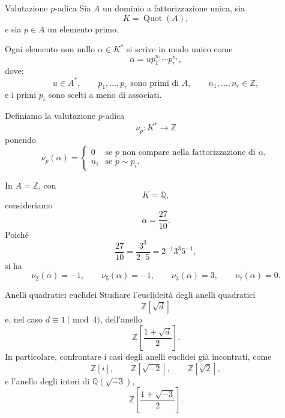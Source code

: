\documentclass[a4paper]{article}
\begin{document}
\begin{radioactive}
\begin{snippetdefinition}{Valutazione \(p\)-adica}
    Sia \(A\) un dominio a fattorizzazione unica, sia
    \[
        K=\operatorname{Quot}(A),
    \]
    e sia \(p\in A\) un elemento primo.

    Ogni elemento non nullo \(\alpha\in K^\ast\) si scrive in modo unico come
    \[
        \alpha
        =
        u p_1^{n_1}\cdots p_r^{n_r},
    \]
    dove:
    \[
        u\in A^\ast,
        \qquad
        p_1,\ldots,p_r \text{ sono primi di } A,
        \qquad
        n_1,\ldots,n_r\in\mathbb{Z},
    \]
    e i primi \(p_i\) sono scelti a meno di associati.

    Definiamo la valutazione \(p\)-adica
    \[
        \nu_p\colon K^\ast\to\mathbb{Z}
    \]
    ponendo
    \[
        \nu_p(\alpha)
        =
        \begin{cases}
            0 & \text{se } p \text{ non compare nella fattorizzazione di } \alpha,\\
            n_i & \text{se } p\sim p_i.
        \end{cases}
    \]
\end{snippetdefinition}
\end{radioactive}

\begin{radioactive}
\begin{snippetexample}{}
    In \(A=\mathbb{Z}\), con
    \[
        K=\mathbb{Q},
    \]
    consideriamo
    \[
        \alpha=\frac{27}{10}.
    \]
    Poiché
    \[
        \frac{27}{10}
        =
        \frac{3^3}{2\cdot 5}
        =
        2^{-1}3^3 5^{-1},
    \]
    si ha
    \[
        \nu_2(\alpha)=-1,
        \qquad
        \nu_5(\alpha)=-1,
        \qquad
        \nu_3(\alpha)=3,
        \qquad
        \nu_7(\alpha)=0.
    \]
\end{snippetexample}
\end{radioactive}

\pagebreak

\begin{radioactive}
\begin{snippetexercise}{Anelli quadratici euclidei}
    Studiare l'euclideità degli anelli quadratici
    \[
        \mathbb{Z}[\sqrt{d}]
    \]
    e, nel caso \(d\equiv 1 \pmod 4\), dell'anello
    \[
        \mathbb{Z}\left[\frac{1+\sqrt{d}}{2}\right].
    \]
    In particolare, confrontare i casi degli anelli euclidei già incontrati, come
    \[
        \mathbb{Z}[i],
        \qquad
        \mathbb{Z}[\sqrt{-2}],
        \qquad
        \mathbb{Z}[\sqrt{2}],
    \]
    e l'anello degli interi di \(\mathbb{Q}(\sqrt{-3})\),
    \[
        \mathbb{Z}\left[\frac{1+\sqrt{-3}}{2}\right].
    \]
\end{snippetexercise}
\end{radioactive}
\end{document}
